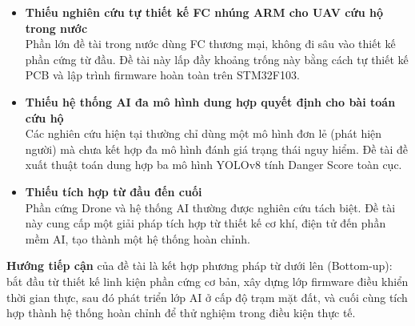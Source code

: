 \begin{itemize}
    \item \textbf{Thiếu nghiên cứu tự thiết kế FC nhúng ARM cho UAV cứu hộ trong nước}\\
    Phần lớn đề tài trong nước dùng FC thương mại, không đi sâu vào thiết kế phần cứng từ đầu. Đề tài này lấp đầy khoảng trống này bằng cách tự thiết kế PCB và lập trình firmware hoàn toàn trên STM32F103.

    \item \textbf{Thiếu hệ thống AI đa mô hình dung hợp quyết định cho bài toán cứu hộ}\\
    Các nghiên cứu hiện tại thường chỉ dùng một mô hình đơn lẻ (phát hiện người) mà chưa kết hợp đa mô hình đánh giá trạng thái nguy hiểm. Đề tài đề xuất thuật toán dung hợp ba mô hình YOLOv8 tính Danger Score toàn cục.

    \item \textbf{Thiếu tích hợp từ đầu đến cuối}\\
    Phần cứng Drone và hệ thống AI thường được nghiên cứu tách biệt. Đề tài này cung cấp một giải pháp tích hợp từ thiết kế cơ khí, điện tử đến phần mềm AI, tạo thành một hệ thống hoàn chỉnh.
\end{itemize}

\textbf{Hướng tiếp cận} của đề tài là kết hợp phương pháp từ dưới lên (Bottom-up): bắt đầu từ thiết kế linh kiện phần cứng cơ bản, xây dựng lớp firmware điều khiển thời gian thực, sau đó phát triển lớp AI ở cấp độ trạm mặt đất, và cuối cùng tích hợp thành hệ thống hoàn chỉnh để thử nghiệm trong điều kiện thực tế.
